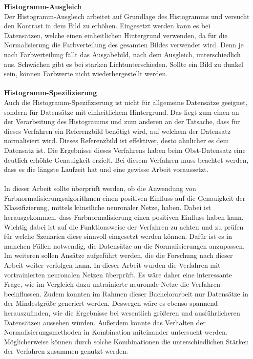 \textbf{Histogramm-Ausgleich}\\
Der Histogramm-Ausgleich arbeitet auf Grundlage des Histogramms und versucht den Kontrast in dem Bild zu erhöhen. Eingesetzt werden kann es bei Datensätzen, welche einen einheitlichen Hintergrund verwenden, da für die Normalisierung die Farbverteilung des gesamten Bildes verwendet wird. Denn je nach Farbverteilung fällt das Ausgabebild, nach dem Ausgleich, unterschiedlich aus. Schwächen gibt es bei starken Lichtunterschieden. Sollte ein Bild zu dunkel sein, können Farbwerte nicht wiederhergestellt werden.\\\\
\textbf{Histogramm-Spezifizierung}\\
Auch die Histogramm-Spezifizierung ist nicht für allgemeine Datensätze geeignet, sondern für Datensätze mit einheitlichem Hintergrund. Das liegt zum einen an der Verarbeitung des Histogramms und zum anderen an der Tatsache, dass für dieses Verfahren ein Referenzbild benötigt wird, auf welchem der Datensatz normalisiert wird. Dieses Referenzbild ist effektiver, desto ähnlicher es dem Datensatz ist. Die Ergebnisse dieses Verfahrens haben beim Obst-Datensatz eine deutlich erhöhte Genauigkeit erzielt. Bei diesem Verfahren muss beachtet werden, dass es die längste Laufzeit hat und eine gewisse Arbeit voraussetzt.\\\\
In dieser Arbeit sollte überprüft werden, ob die Anwendung von Farbnormalisierungsalgorithmen einen positiven Einfluss auf die Genauigkeit der Klassifizierung, mittels künstliche neuronaler Netze, haben. Dabei ist herausgekommen, dass Farbnormalisierung einen positiven Einfluss haben kann. Wichtig dabei ist auf die Funktionsweise der Verfahren zu achten und zu prüfen für welche Szenarien diese sinnvoll eingesetzt werden können. Dafür ist es in manchen Fällen notwendig, die Datensätze an die Normalisierungen anzupassen.\\
Im  weiteren sollen Ansätze aufgeführt werden, die die Forschung nach dieser Arbeit weiter verfolgen kann. In dieser Arbeit wurden die Verfahren mit vortrainierten neuronalen Netzen überprüft. Es wäre daher eine interessante Frage, wie im Vergleich dazu untrainierte neuronale Netze die Verfahren beeinflussen. Zudem konnten im Rahmen dieser Bachelorarbeit nur Datensätze in der Mindestgröße generiert werden. Deswegen wäre es ebenso spannend herauszufinden, wie die Ergebnisse bei wesentlich größeren und ausführlicheren Datensätzen aussehen würden. Außerdem könnte das Verhalten der Normalisierungsmethoden in Kombination miteinander untersucht werden. Möglicherweise können durch solche Kombinationen die unterschiedlichen Stärken der Verfahren zusammen genutzt werden.  
